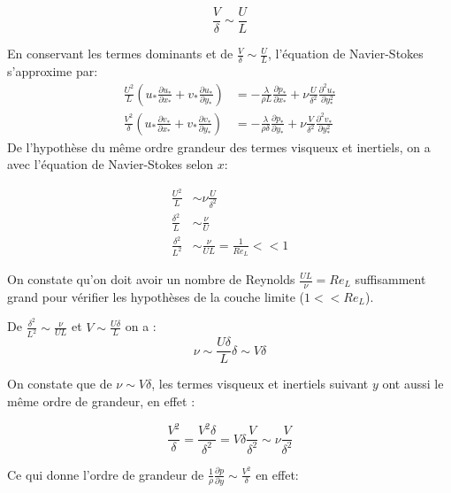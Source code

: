 \documentclass[french]{article}
\begin{document}
\begin{equation*}
	\frac{V}{\delta} \sim \frac{U}{L}
\end{equation*}

En conservant les termes dominants et de $\frac{V}{\delta} \sim \frac{U}{L}$, l'équation de Navier-Stokes s'approxime par:
\begin{align*}
	\frac{U^{2}}{L}
	\left(
	u_{*}\frac{\partial u_{*}}{\partial x_{*}} + 
	v_{*}\frac{\partial u_{*}}{\partial y_{*}} 
	\right)
	&= - \frac{\lambda}{\rho L}
	\frac{\partial p_{*}}{\partial  x_{*}} +
	\nu  \frac{U}{\delta^{2}}
	\frac{\partial^{2} u_{*}}{\partial  y_{*}^{2}} \\
	\frac{V^{2}}{\delta}
	\left(
	u_{*}\frac{\partial v_{*}}{\partial x_{*}} + 
	v_{*}\frac{\partial v_{*}}{\partial y_{*}} 
	\right)
	&= - \frac{\lambda}{\rho\delta}
	\frac{\partial p_{*}}{\partial  y_{*}} +
	\nu\frac{V}{\delta^{2}}
	\frac{\partial^{2} v_{*}}{\partial  y_{*}^{2}} 
\end{align*}
De l'hypothèse du même ordre grandeur des termes visqueux et inertiels, on a avec l'équation de Navier-Stokes selon $x$:

\begin{align*}
	\frac{U^{2}}{L} &\sim 
	\nu\frac{U}{\delta^{2}} \\
	\frac{\delta^{2}}{L} &\sim 
	\frac{\nu}{U}\\
	\frac{\delta^{2}}{L^{2}} &\sim 
	\frac{\nu}{UL} = \frac{1}{Re_{L}} << 1
\end{align*}

On constate qu'on doit avoir un nombre de Reynolds $\frac{UL}{\nu} = Re_{L}$ suffisamment grand pour vérifier les hypothèses de la couche limite ($1 << Re_{L}$).

De $ \frac{\delta^{2}}{L^{2}} \sim \frac{\nu}{UL} $  
et $ V \sim \frac{U\delta}{L}$ on a :
\begin{equation*}
	\nu \sim \frac{U\delta}{L}\delta \sim V\delta
\end{equation*}

On constate que de $\nu \sim V\delta$, les termes visqueux et inertiels suivant $y$ ont aussi le même ordre de grandeur, en effet : 

\begin{equation*}
	\frac{V^{2}}{\delta} =
	\frac{V^{2}\delta}{\delta ^ 2} =
	V\delta \frac{V}{\delta^{2}} \sim \nu \frac{V}{\delta^{2}}
\end{equation*}

Ce qui donne l'ordre de grandeur de $\frac{1}{\rho}\frac{\partial p}{\partial y} \sim \frac{V^{2}}{\delta}$ en effet:
\end{document}
